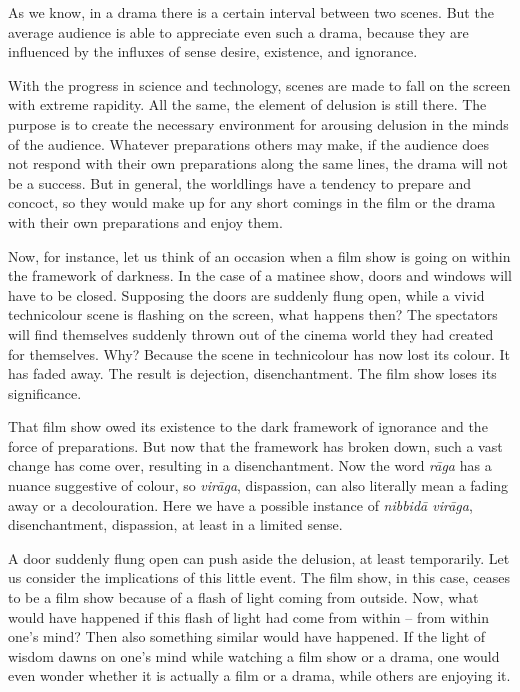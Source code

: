 As we know, in a drama there is a certain interval between two scenes. But the average audience is able to appreciate even such a drama, because they are influenced by the influxes of sense desire, existence, and ignorance.

With the progress in science and technology, scenes are made to fall on the screen with extreme rapidity. All the same, the element of delusion is still there. The purpose is to create the necessary environment for arousing delusion in the minds of the audience. Whatever preparations others may make, if the audience does not respond with their own preparations along the same lines, the drama will not be a success. But in general, the worldlings have a tendency to prepare and concoct, so they would make up for any short comings in the film or the drama with their own preparations and enjoy them.

Now, for instance, let us think of an occasion when a film show is going on within the framework of darkness. In the case of a matinee show, doors and windows will have to be closed. Supposing the doors are suddenly flung open, while a vivid technicolour scene is flashing on the screen, what happens then? The spectators will find themselves suddenly thrown out of the cinema world they had created for themselves. Why? Because the scene in technicolour has now lost its colour. It has faded away. The result is dejection, disenchantment. The film show loses its significance.

That film show owed its existence to the dark framework of ignorance and the force of preparations. But now that the framework has broken down, such a vast change has come over, resulting in a disenchantment. Now the word \emph{rāga} has a nuance suggestive of colour, so \emph{virāga}, dispassion, can also literally mean a fading away or a decolouration. Here we have a possible instance of \emph{nibbidā virāga}, disenchantment, dispassion, at least in a limited sense.

A door suddenly flung open can push aside the delusion, at least temporarily. Let us consider the implications of this little event. The film show, in this case, ceases to be a film show because of a flash of light coming from outside. Now, what would have happened if this flash of light had come from within -- from within one's mind? Then also something similar would have happened. If the light of wisdom dawns on one's mind while watching a film show or a drama, one would even wonder whether it is actually a film or a drama, while others are enjoying it.

